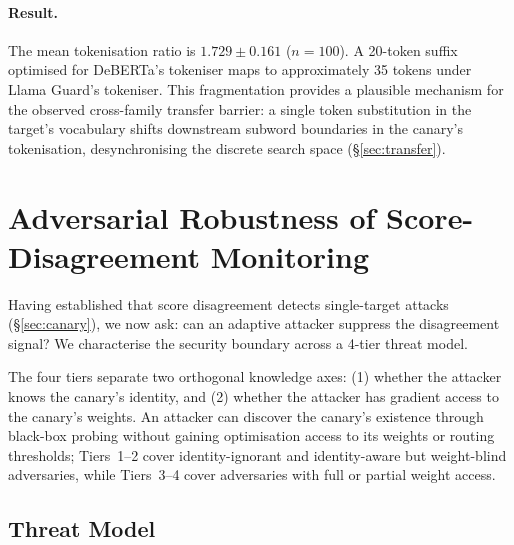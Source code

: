 \paragraph{Result.} The mean tokenisation ratio is $1.729 \pm 0.161$ ($n = 100$). A 20-token suffix optimised for DeBERTa's tokeniser maps to approximately 35 tokens under Llama Guard's tokeniser. This fragmentation provides a plausible mechanism for the observed cross-family transfer barrier: a single token substitution in the target's vocabulary shifts downstream subword boundaries in the canary's tokenisation, desynchronising the discrete search space (\S\ref{sec:transfer}).

\section{Adversarial Robustness of Score-Disagreement Monitoring}
\label{sec:adversarial-robustness}

Having established that score disagreement detects single-target attacks (\S\ref{sec:canary}), we now ask: can an adaptive attacker suppress the disagreement signal? We characterise the security boundary across a 4-tier threat model.

The four tiers separate two orthogonal knowledge axes: (1) whether the attacker knows the canary's identity, and (2) whether the attacker has gradient access to the canary's weights. An attacker can discover the canary's existence through black-box probing without gaining optimisation access to its weights or routing thresholds; Tiers~1--2 cover identity-ignorant and identity-aware but weight-blind adversaries, while Tiers~3--4 cover adversaries with full or partial weight access.

\subsection{Threat Model}
\label{sec:threat-model}

